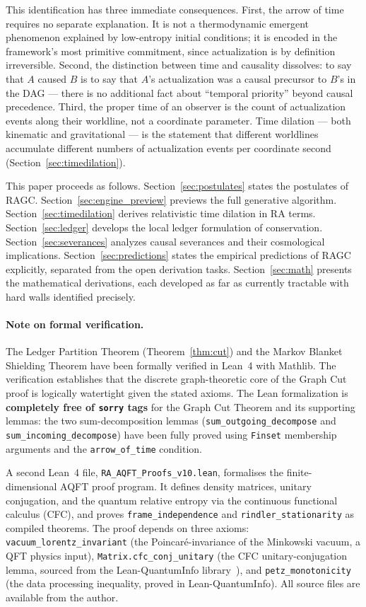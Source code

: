 \documentclass[11pt,a4paper]{article}
\theoremstyle{plain}
\theoremstyle{definition}
\theoremstyle{remark}
\begin{document}
This identification has three immediate consequences. First, the arrow of time
requires no separate explanation. It is not a thermodynamic emergent phenomenon
explained by low-entropy initial conditions; it is encoded in the framework's most
primitive commitment, since actualization is by definition irreversible. Second,
the distinction between time and causality dissolves: to say that $A$ caused $B$
is to say that $A$'s actualization was a causal precursor to $B$'s in the DAG ---
there is no additional fact about ``temporal priority'' beyond causal precedence.
Third, the proper time of an observer is the count of actualization events along
their worldline, not a coordinate parameter. Time dilation --- both kinematic and
gravitational --- is the statement that different worldlines accumulate different
numbers of actualization events per coordinate second (Section~\ref{sec:timedilation}).

This paper proceeds as follows. Section~\ref{sec:postulates} states the postulates
of RAGC. Section~\ref{sec:engine_preview} previews the full generative algorithm. Section~\ref{sec:timedilation} derives relativistic time dilation in RA
terms. Section~\ref{sec:ledger} develops the local ledger formulation of
conservation. Section~\ref{sec:severances} analyzes causal severances and their
cosmological implications. Section~\ref{sec:predictions} states the empirical
predictions of RAGC explicitly, separated from the open derivation tasks.
Section~\ref{sec:math} presents the mathematical derivations, each developed
as far as currently tractable with hard walls identified precisely.

\paragraph{Note on formal verification.}
The Ledger Partition Theorem (Theorem~\ref{thm:cut}) and the Markov Blanket
Shielding Theorem have been formally verified in Lean~4 with Mathlib. The
verification establishes that the discrete graph-theoretic core of the Graph Cut
proof is logically watertight given the stated axioms. The Lean formalization is
\textbf{completely free of \texttt{sorry} tags} for the Graph Cut Theorem and its
supporting lemmas: the two sum-decomposition lemmas
(\texttt{sum\_outgoing\_decompose} and \texttt{sum\_incoming\_decompose}) have
been fully proved using \texttt{Finset} membership arguments and the
\texttt{arrow\_of\_time} condition.

A second Lean~4 file, \texttt{RA\_AQFT\_Proofs\_v10.lean}, formalises the
finite-dimensional AQFT proof program. It defines density matrices, unitary
conjugation, and the quantum relative entropy via the continuous functional
calculus (CFC), and proves \texttt{frame\_independence}
and \texttt{rindler\_stationarity} as compiled
theorems. The proof depends on three axioms: \texttt{vacuum\_lorentz\_invariant}
(the Poincar\'{e}-invariance of the Minkowski vacuum, a QFT physics input),
\texttt{Matrix.cfc\_conj\_unitary} (the CFC unitary-conjugation lemma, sourced
from the Lean-QuantumInfo library~\citep{Meiburg2025LQI}), and
\texttt{petz\_monotonicity} (the data processing inequality, proved in
Lean-QuantumInfo). All source files are available from the author.
\end{document}
